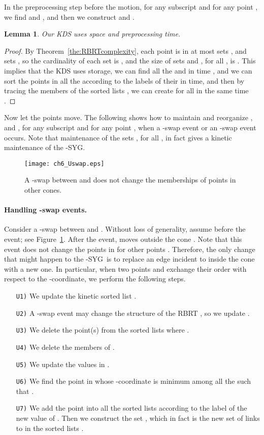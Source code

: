 \documentclass[preprint,12pt]{elsarticle}
\def\1syg{\mbox{-SYG}}
\newtheorem{lemma}{Lemma}[section]
\begin{document}
In the preprocessing step before the motion, for any subscript  and for any point , we find  and , and then we construct  and .

\begin{lemma}\label{the:PreProcStep}
Our KDS uses   space and  preprocessing time.
\end{lemma}
\begin{proof}
By Theorem~\ref{the:RBRTcomplexity}, each point  is in at most  sets , and  sets , so the cardinality of each set  is , and the size of sets  and , for all , is . This implies that  the KDS uses  storage,  we can find all the  and  in time , and   we can sort the points  in all the  according to the labels of their  in  time, and then by tracing the members of the sorted lists , we can create  for all  in the same time  .
\end{proof}

Now let the points move. The following shows how to maintain and reorganize ,  and , for any subscript  and for any point ,  when a -swap event or an -swap event occurs. Note that maintenance of the sets , for all , in fact gives a kinetic maintenance of the \1syg.

\begin{figure}[t]
\centering
\texttt{[image: ch6\_Uswap.eps]}
\caption{A -swap between  and  does not change the memberships of points in other cones.}
\label{fig:Uswap}
\end{figure}

\paragraph{Handling -swap events.} Consider a -swap between  and . Without loss of generality, assume  before the event; see Figure~\ref{fig:Uswap}. After the event,  moves outside the cone . Note that this event does not change the points in  for other points . Therefore, the only change that might happen to the \1syg~is to replace an edge incident to  inside the cone  with a new one. In particular, when two points  and  exchange their order with respect to the -coordinate, we perform the following steps.
\begin{itemize}
\item[\texttt{U1)}] We update the kinetic sorted list .
\item[\texttt{U2)}] A -swap event may change the structure of the RBRT , so we update .
\item[\texttt{U3)}] We delete the point(s)  from the sorted lists  where .
\item[\texttt{U4)}] We delete the members of .
\item[\texttt{U5)}] We update the values in .
\item[\texttt{U6)}] We find the point  in  whose -coordinate is minimum among all the  such that .
\item[\texttt{U7)}] We add the point  into all the sorted lists  according to the label of the new value of . Then we construct the set , which in fact is the new set of links to  in the sorted lists .
\end{itemize}
\end{document}

